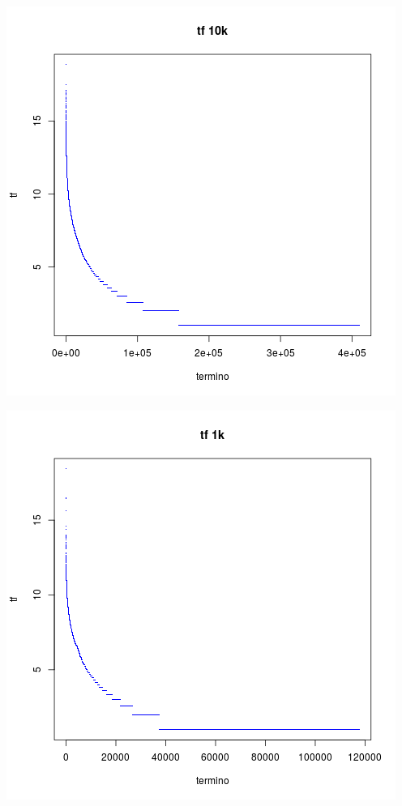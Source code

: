 \begin{center}\includegraphics{img/tf10k.png}
\end{center}
\begin{center}\includegraphics{img/tf1k.png}
\end{center}
